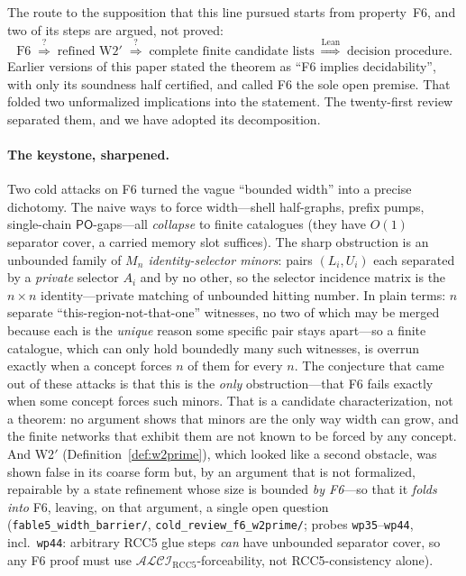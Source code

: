 \documentclass[11pt]{article}
\newcommand{\ALCIRCC}[1]{\mathcal{ALCI}_{\mathrm{RCC#1}}}
\newcommand{\PO}{\mathsf{PO}}
\theoremstyle{plain}
\theoremstyle{definition}
\begin{document}
\noindent The route to the supposition that this line pursued starts from
property~F6, and two of its steps are argued, not proved:
\[
  \text{F6}
  \;\overset{?}{\Longrightarrow}\;
  \text{refined W2$'$}
  \;\overset{?}{\Longrightarrow}\;
  \text{complete finite candidate lists}
  \;\overset{\text{Lean}}{\Longrightarrow}\;
  \text{decision procedure}.
\]
Earlier versions of this paper stated the theorem as ``F6 implies
decidability'', with only its soundness half certified, and called F6 the
sole open premise. That folded two unformalized implications into the
statement. The twenty-first review~\cite{GPT56SolReview} separated them,
and we have adopted its decomposition.

\paragraph{The keystone, sharpened.} Two cold attacks on F6 turned the
vague ``bounded width'' into a precise dichotomy. The naive ways to force
width---shell half-graphs, prefix pumps, single-chain $\PO$-gaps---all
\emph{collapse} to finite catalogues (they have $O(1)$ separator cover, a
carried memory slot suffices). The sharp obstruction is an unbounded
family of \emph{$M_n$ identity-selector minors}: pairs $(L_i,U_i)$ each
separated by a \emph{private} selector $A_i$ and by no other, so the
selector incidence matrix is the $n\times n$ identity---private matching
of unbounded hitting number. In plain terms: $n$ separate
``this-region-not-that-one'' witnesses, no two of which may be merged
because each is the \emph{unique} reason some specific pair stays apart---so
a finite catalogue, which can only hold boundedly many such witnesses, is
overrun exactly when a concept forces $n$ of them for every $n$. The
conjecture that came out of these attacks is that this is the \emph{only}
obstruction---that F6 fails exactly when some concept forces such minors.
That is a candidate characterization, not a theorem: no argument shows that
minors are the only way width can grow, and the finite networks that exhibit
them are not known to be forced by any concept. And W2$'$
(Definition~\ref{def:w2prime}), which looked like a second obstacle, was
shown false in its coarse form but, by an argument that is not formalized,
repairable by a state refinement whose size is bounded \emph{by F6}---so that
it \emph{folds into} F6, leaving, on that argument, a single open question
(\texttt{fable5\_width\_barrier/}, \texttt{cold\_review\_f6\_w2prime/};
probes \texttt{wp35}--\texttt{wp44}, incl.\ \texttt{wp44}: arbitrary RCC5
glue steps \emph{can} have unbounded separator cover, so any F6 proof must
use $\ALCIRCC{5}$-forceability, not RCC5-consistency alone).
\end{document}
